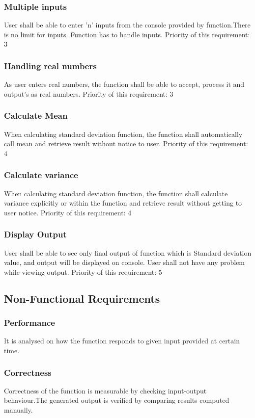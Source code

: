 \documentclass[a4paper,12pt]{article}
\begin{document}
\begin{titlepage}
\subsubsection{Multiple inputs}
User shall be able to enter 'n' inputs from the console provided by function.There is no limit for inputs. Function has to handle inputs.\newline
Priority of this requirement: 3
\subsubsection{Handling real numbers}
As user enters real numbers, the function shall be able to accept, process it and output's as real numbers.\newline
Priority of this requirement: 3
\subsubsection{Calculate Mean}
When calculating standard deviation function, the function shall automatically call mean and retrieve result without notice to user. \newline
Priority of this requirement: 4
\subsubsection{Calculate variance}
When calculating standard deviation function, the function shall calculate variance explicitly or within the function and retrieve result without getting to user notice. \newline
Priority of this requirement: 4
\subsubsection{Display Output}
User shall be able to see only final output of function which is Standard deviation value, and output will be displayed on console. User shall not have any problem while viewing output. \newline
Priority of this requirement: 5
\subsection{Non-Functional Requirements}
\subsubsection{Performance}
It is analysed on how the function responds to given input provided at certain time. 
\subsubsection{Correctness}
Correctness of the function is measurable by checking input-output behaviour.The generated output is verified by comparing results computed manually.

\end{titlepage}
\end{document}
